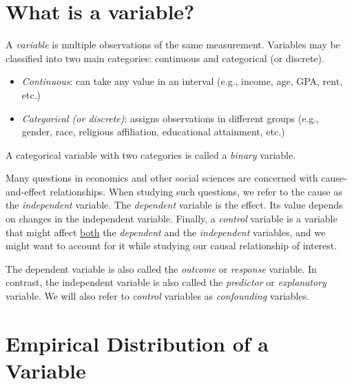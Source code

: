 \documentclass{./../../Latex/handout}
\begin{document}
\thispagestyle{plain}

\vspace{-1cm}
\section{What is a variable?}

A \textit{variable} is multiple observations of the same measurement. Variables may be classified into two main categories: continuous and categorical (or discrete).
\begin{itemize}
\item \textit{Continuous}: can take any value in an interval (e.g., income, age, GPA, rent, etc.)
\item \textit{Categorical (or discrete)}: assigns observations in different groups  (e.g., gender, race, religious affiliation, educational attainment, etc.)
\end{itemize}
A categorical variable with two categories is called a \textit{binary} variable. 

Many questions in economics and other social sciences are concerned with cause-and-effect relationships. When studying such questions, we refer to the cause as the \textit{independent} variable. The \textit{dependent} variable is the effect. Its value depends on changes in the independent variable. Finally, a \textit{control} variable is a variable that might affect \underline{both} the \textit{dependent} and the \textit{independent} variables, and we might want to account for it while studying our causal relationship of interest. 
\begin{center}
\end{center}

The dependent variable is also called the \textit{outcome} or \textit{response} variable. In contrast, the independent variable is also called the \textit{predictor} or \textit{explanatory} variable. We will also refer to \textit{control} variables as \textit{confounding} variables. 

\section{Empirical Distribution of a Variable}
\end{document}
